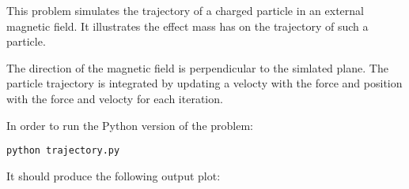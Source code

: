 





This problem simulates the trajectory of a charged particle in an
external magnetic field. It illustrates the effect mass has on the
trajectory of such a particle.

The direction of the magnetic field is
perpendicular to the simlated plane. The particle trajectory is
integrated by updating a velocty with the force and position with the
force and velocty for each iteration.

In order to run the Python version of the problem:

\begin{lstlisting}
python trajectory.py
\end{lstlisting}

It should produce the following output plot:



